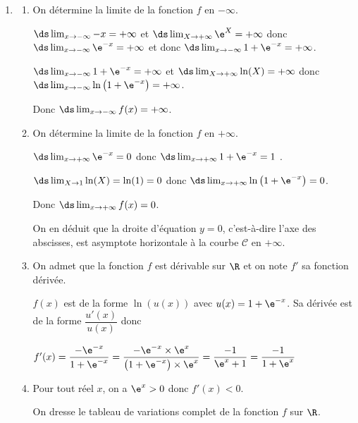 \begin{enumerate}
\item 
	\begin{enumerate}
		\item On détermine la limite de la fonction $f$ en $-\infty$.
		
$\ds\lim_{x\to -\infty} -x = +\infty$ et $\ds\lim_{X\to +\infty} \e^{X}=+\infty$ donc $\ds\lim_{x\to -\infty} \e^{-x}=+\infty$ et donc $\ds\lim_{x\to -\infty} 1+\e^{-x}=+\infty$.

$\ds\lim_{x\to -\infty} 1+\e^{-x}=+\infty$ et $\ds\lim_{X\to +\infty} \ln(X)=+\infty$ donc $\ds\lim_{x\to -\infty} \ln\left (1+\e^{-x}\right )=+\infty$.

Donc $\ds\lim_{x\to -\infty} f(x)=+\infty$.
		
		\item On détermine la limite de la fonction $f$ en $+\infty$.
		
$\ds\lim_{x\to +\infty} \e^{-x} = 0$ donc $\ds\lim_{x\to +\infty} 1+\e^{-x} = 1$ .

$\ds\lim_{X\to 1} \ln(X)= \ln(1) = 0$ donc $\ds\lim_{x\to +\infty} \ln\left (1+\e^{-x}\right ) = 0$.

Donc $\ds\lim_{x\to +\infty} f(x)=0$.


On en déduit que la droite d'équation $y=0$, c'est-à-dire l'axe des abscisses, est asymptote horizontale à la courbe $\mathcal{C}$ en $+\infty$.

		\item On admet que la fonction $f$ est dérivable sur $\R$ et on note $f'$ sa fonction dérivée.

$f(x)$ est de la forme $\ln(u(x))$ avec $u(x)=1+\e^{-x}$.
Sa dérivée est de la forme $\dfrac{u'(x)}{u(x)}$ donc

$f'(x)= \dfrac{-\e^{-x}}{1+\e^{-x}} =  \dfrac{-\e^{-x}\times \e^{x}}{\left (1+\e^{-x}\right )\times \e^{x}} = \dfrac{-1}{\e^{x}+1}=\dfrac{-1}{1+\e^{x}}$
		
		\item Pour tout réel $x$, on a $\e^{x}>0$ donc $f'(x)<0$.
		
On dresse le tableau de variations complet de la fonction $f$ sur $\R$.


\end{enumerate}
\end{enumerate}
